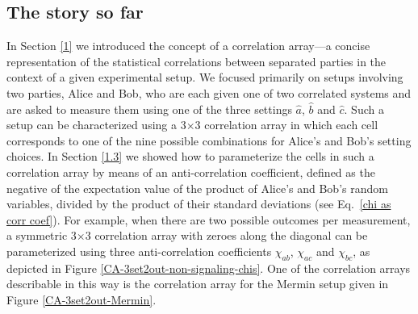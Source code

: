 
\subsection{The story so far}
\label{4.1}

In Section \ref{1} we introduced the concept of a correlation array---a concise representation of the statistical correlations between separated parties in the context of a given experimental setup. We focused primarily on setups involving two parties, Alice and Bob, who are each given one of two correlated systems and are asked to measure them using one of the three settings $\hat{a}$, $\hat{b}$ and $\hat{c}$. Such a setup can be characterized using a 3$\times$3 correlation array in which each cell corresponds to one of the nine possible combinations for Alice's and Bob's setting choices. In Section \ref{1.3} we showed how to parameterize the cells in such a correlation array by means of an anti-correlation coefficient, defined as the negative of the expectation value of the product of Alice's and Bob's random variables, divided by the product of their standard deviations (see Eq.\ \eqref{chi as corr coef}). For example, when there are two possible outcomes per measurement, a symmetric 3$\times$3 correlation array with zeroes along the diagonal can be parameterized using three anti-correlation coefficients $\chi_{ab}$, $\chi_{ac}$ and $\chi_{bc}$, as depicted in Figure \ref{CA-3set2out-non-signaling-chis}. One of the correlation arrays describable in this way is the correlation array for the Mermin setup given in Figure \ref{CA-3set2out-Mermin}.


